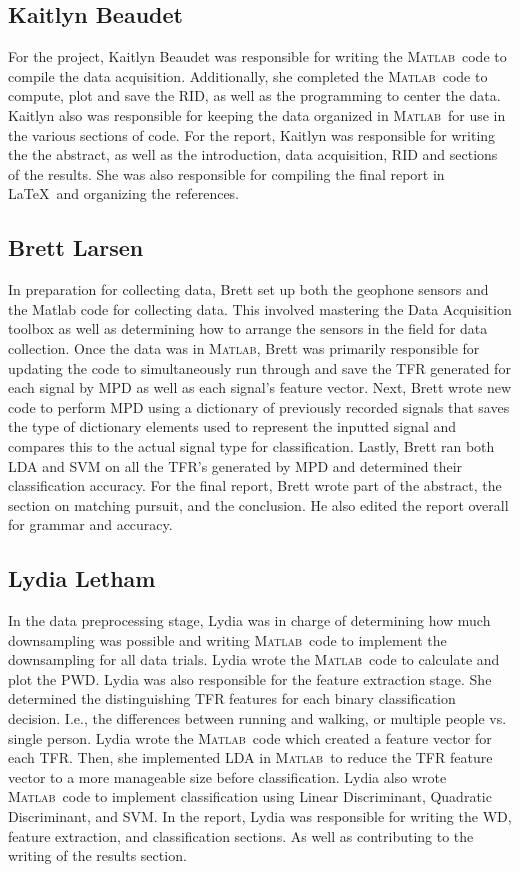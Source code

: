 \documentclass{article}[11pt]
\newcommand{\Matlab}{\textsc{Matlab}}
\begin{document}
\subsection{Kaitlyn Beaudet}
\label{sec:Kaitlyn} 
For the project, Kaitlyn Beaudet was responsible for writing the \Matlab \ code to compile the data acquisition. Additionally, she completed the \Matlab \ code to compute, plot and save the RID, as well as the programming to center the data. Kaitlyn also was responsible for keeping the data organized in \Matlab \ for use in the various sections of code. For the report, Kaitlyn was responsible for writing the the abstract, as well as the introduction, data acquisition, RID and sections of the results. She was also responsible for compiling the final report in \LaTeX \ and organizing the references. 
\subsection{Brett Larsen}
\label{sec:Brett}
In preparation for collecting data, Brett set up both the geophone sensors and the Matlab code for collecting data. This involved mastering the Data Acquisition toolbox as well as determining how to arrange the sensors in the field for data collection. Once the data was in \Matlab, Brett was primarily responsible for updating the code to simultaneously run through and save the TFR generated for each signal by MPD as well as each signal's feature vector. Next, Brett wrote new code to perform MPD using a dictionary of previously recorded signals that saves the type of dictionary elements used to represent the inputted signal and compares this to the actual signal type for classification. Lastly, Brett ran both LDA and SVM on all the TFR's generated by MPD and determined their classification accuracy. For the final report, Brett wrote part of the abstract, the section on matching pursuit, and the conclusion. He also edited the report overall for grammar and accuracy.
\subsection{Lydia Letham}
\label{sec:Lydia}
In the data preprocessing stage, Lydia was in charge of determining how much downsampling was possible and writing \Matlab \ code to implement the downsampling for all data trials.  Lydia wrote the \Matlab \ code to calculate and plot the PWD. Lydia was also responsible for the feature extraction stage.  She determined the distinguishing TFR features for each binary classification decision. I.e., the differences between running and walking, or multiple people vs. single person. Lydia wrote the \Matlab \ code which created a feature vector for each TFR.  Then, she implemented LDA in \Matlab \ to reduce the TFR feature vector to a more manageable size before classification.  Lydia also wrote \Matlab \ code to implement classification using Linear Discriminant, Quadratic Discriminant, and SVM. In the report, Lydia was responsible for writing the WD, feature extraction, and classification sections.  As well as contributing to the writing of the results section.
\end{document}
